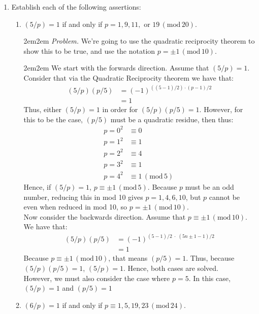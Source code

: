 \documentclass[10pt,oneside]{book}
\newcommand{\gspc}{\vspace{0.13cm}} %
\newcommand{\gline}{\gspc\\} %
\newcommand{\gmod}[1]{\,(\text{mod}\,#1)}
\let\endoldproof\endproof
\renewenvironment{proof}[1][\proofname]
  {\vspace{0.2cm}\begin{adjustwidth}{2em}{2em}
   \oldproof[#1]}
  {\endoldproof
\end{adjustwidth}}
\newenvironment{problem}[1]
  {\vspace{-0.1cm}\begin{coloredadjust}\begin{adjustwidth}{2em}{2em}
   \textit{Problem. }#1}
  {\endoldproof
\end{adjustwidth}\end{coloredadjust}\gspc}
\begin{document}
\begin{enumerate}
\begin{enumerate}
\begin{problem}
    \end{problem}
  \end{enumerate}
  \item [10.] Establish each of the following assertions:
  \begin{enumerate}
    \item $(5/p)=1$ if and only if $p = 1,9,11,$ or $19\gmod {20}$.
    \begin{problem}
      We're going to use the quadratic reciprocity theorem to show this to be true, and use the notation $p=\pm 1\gmod{10}$. 
      \begin{proof}
        We start with the forwards direction. Assume that $(5/p)=1$. Consider that via the Quadratic Reciprocity theorem we have that:
        \begin{align*}
          (5/p)(p/5)&=(-1)^{((5-1)/2)\cdot (p-1)/2}\\
          &= 1
        \end{align*}
        Thus, either $(5/p)=1$ in order for $(5/p)(p/5)=1$. However, for this to be the case, $(p/5)$ must be a quadratic residue, then thus:
        \begin{align*}
          p = 0^2 &\equiv 0\\
          p = 1^2 &\equiv 1\\
          p = 2^2 &\equiv 4\\
          p = 3^2 &\equiv 1\\
          p = 4^2 &\equiv 1\gmod 5\
        \end{align*} 
        Hence, if $(5/p)=1$, $p\equiv \pm 1\gmod{5}$. Because $p$ must be an odd number, reducing this in mod 10 gives $p = 1, 4, 6, 10$, but $p$ cannot be even when reduced in mod 10, so $p=\pm 1 \gmod{10}$. \gline
        Now consider the backwards direction. Assume that $p\equiv \pm 1\gmod{10}$. We have that:
        \begin{align*}
          (5/p)(p/5)&=(-1)^{(5-1)/2\; \cdot\; (5n\pm 1-1)/2}\\
          &= 1
        \end{align*}
        Because $p\equiv \pm 1 \gmod{10}$, that means $(p/5)=1$. Thus, because $(5/p)(p/5)=1$, $(5/p)=1$. Hence, both cases are solved. \gline
        However, we must also consider the case where $p = 5$. In this case, $(5/p) = 1$ and $(p/5)=1$
      \end{proof}
    \end{problem}
    \item $(6/p)=1$ if and only if $p \equiv 1, 5, 19, 23\gmod{24}$.

\end{enumerate}
\end{enumerate}
\end{document}
